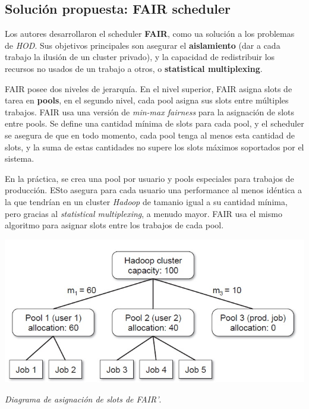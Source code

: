 \subsection{Soluci\'on propuesta: FAIR scheduler}

Los autores desarrollaron el scheduler \textbf{FAIR}, como ua soluci\'on a los problemas de \emph{HOD}. Sus objetivos principales son asegurar el \textbf{aislamiento} (dar a cada trabajo la ilusi\'on de un cluster privado), y la capacidad de redistribuir los recursos no usados de un trabajo a otros, o \textbf{statistical multiplexing}.

\vspace{2mm}

FAIR posee dos niveles de jerarqu\'ia. En el nivel superior, FAIR asigna slots de tarea en \textbf{pools}, en el segundo nivel, cada pool
asigna sus slots entre m\'ultiples trabajos. FAIR usa una versi\'on de \emph{min-max fairness} para la asignaci\'on de slots entre pools. Se define una cantidad m\'inima de slots para cada pool, y el scheduler se asegura de que en todo momento, cada pool tenga al menos esta cantidad de slots, y la suma de estas cantidades no supere los slots m\'aximos soportados por el sistema.

\vspace{2mm}

En la pr\'actica, se crea una pool por usuario y pools especiales para trabajos de producci\'on. ESto asegura para cada usuario una performance al menos id\'entica a la que tendr\'ian en un cluster \emph{Hadoop} de tamanio igual a su cantidad m\'inima, pero gracias al \emph{statistical multiplexing}, a menudo mayor. FAIR usa el mismo algoritmo para asignar slots entre los trabajos de cada pool.

\vspace{2mm}

\begin{center}
\includegraphics[scale=0.8]{pools.jpg}
\end{center}
 \textit{Diagrama de asignaci\'on de slots de FAIR'}.

